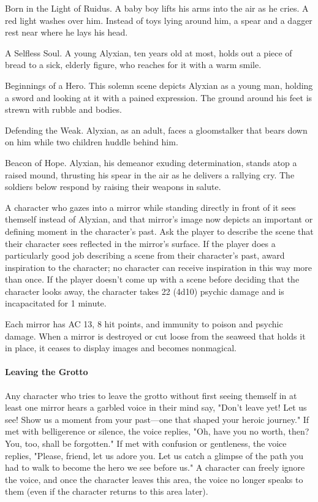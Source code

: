 \documentclass[10pt,a4paper,twoside,bg=print,twocolumn,openany,nodeprecatedcode]{dndbook}
\begin{document}
\begin{description}[nolistsep]
\item[Mirror 1:]
Born in the Light of Ruidus. A baby boy lifts his arms into the air as he cries. A red light washes over him. Instead of toys lying around him, a spear and a dagger rest near where he lays his head.
\item[Mirror 2:]
A Selfless Soul. A young Alyxian, ten years old at most, holds out a piece of bread to a sick, elderly figure, who reaches for it with a warm smile.
\item[Mirror 3:]
Beginnings of a Hero. This solemn scene depicts Alyxian as a young man, holding a sword and looking at it with a pained expression. The ground around his feet is strewn with rubble and bodies.
\item[Mirror 4:]
Defending the Weak. Alyxian, as an adult, faces a gloomstalker that bears down on him while two children huddle behind him.
\item[Mirror 5:]
Beacon of Hope. Alyxian, his demeanor exuding determination, stands atop a raised mound, thrusting his spear in the air as he delivers a rallying cry. The soldiers below respond by raising their weapons in salute.
\end{description}

A character who gazes into a mirror while standing directly in front of it sees themself instead of Alyxian, and that mirror's image now depicts an important or defining moment in the character's past. Ask the player to describe the scene that their character sees reflected in the mirror's surface. If the player does a particularly good job describing a scene from their character's past, award inspiration to the character; no character can receive inspiration in this way more than once. If the player doesn't come up with a scene before deciding that the character looks away, the character takes 22 (4d10) psychic damage and is incapacitated for 1 minute.

Each mirror has AC 13, 8 hit points, and immunity to poison and psychic damage. When a mirror is destroyed or cut loose from the seaweed that holds it in place, it ceases to display images and becomes nonmagical.

\paragraph{Leaving the Grotto}
Any character who tries to leave the grotto without first seeing themself in at least one mirror hears a garbled voice in their mind say, "Don't leave yet! Let us see! Show us a moment from your past—one that shaped your heroic journey." If met with belligerence or silence, the voice replies, "Oh, have you no worth, then? You, too, shall be forgotten." If met with confusion or gentleness, the voice replies, "Please, friend, let us adore you. Let us catch a glimpse of the path you had to walk to become the hero we see before us." A character can freely ignore the voice, and once the character leaves this area, the voice no longer speaks to them (even if the character returns to this area later).
\end{document}
